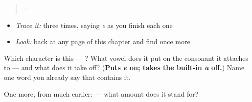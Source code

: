 \begin{quote}
  ·  
\end{quote}

\begin{itemize}
\raggedright
  \item \emph{Trace it:}  three times, saying \emph{e} as you finish each one
  \item \emph{Look:} back at any page of this chapter and find  once more
\end{itemize}

\begin{tcolorbox}[breakable,colback=teal!4,colframe=teal!35!black,title={Before you move on}]
Which character is this — ? What vowel does it put on the consonant it attaches to — and what does it take off? (\textbf{Puts \emph{e} on; takes the built-in \emph{a} off.}) Name one word you already say that contains it.

One more, from much earlier:  — what amount does it stand for?
\end{tcolorbox}
